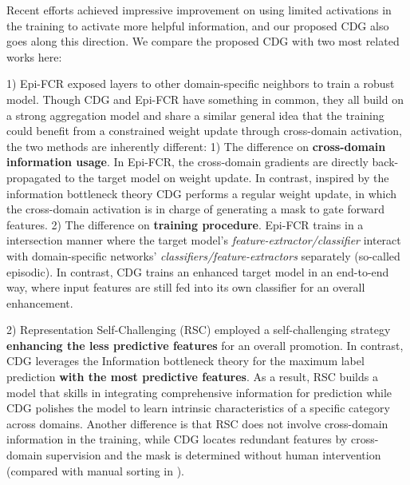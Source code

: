 Recent efforts achieved impressive improvement on using limited activations in the training to activate more helpful information, and our proposed CDG also goes along this direction. We compare the proposed CDG with two most related works here: 

1) Epi-FCR \citep{li2019episodic} exposed layers to other domain-specific neighbors to train a robust model. Though CDG and Epi-FCR have something in common, \eg they all build on a strong aggregation model and share a similar general idea that the training could benefit from a constrained weight update through cross-domain activation, the two methods are inherently different: 1) The difference on \textbf{cross-domain information usage}. In Epi-FCR, the cross-domain gradients are directly back-propagated to the target model on weight update. In contrast, inspired by the information bottleneck theory CDG performs a regular weight update, in which the cross-domain activation is in charge of generating a mask to gate forward features. 2) The difference on \textbf{training procedure}. Epi-FCR trains in a intersection manner where the target model's \textit{feature-extractor/classifier} interact with domain-specific networks' \textit{classifiers/feature-extractors} separately (so-called episodic). In contrast, CDG trains an enhanced target model in an end-to-end way, where input features are still fed into its own classifier for an overall enhancement. 

2) Representation Self-Challenging  \citep{huangRSC2020} (RSC) employed a self-challenging strategy \textbf{enhancing the less predictive features} for an overall promotion. In contrast, CDG leverages the Information bottleneck theory for the maximum label prediction \textbf{with the most predictive features}. As a result, RSC builds a model that skills in integrating comprehensive information for prediction while CDG polishes the model to learn intrinsic characteristics of a specific category across domains. Another difference is that RSC does not involve cross-domain information in the training, while CDG locates redundant features by cross-domain supervision and the mask is determined without human intervention (compared with manual sorting in \citep{huangRSC2020}). 

